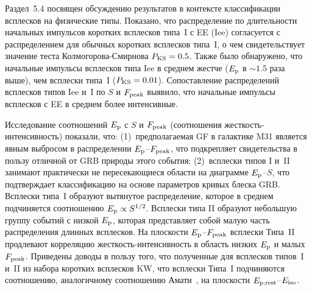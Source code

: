 Раздел~5.4 посвящен обсуждению результатов в контексте классификации всплесков на физические типы.
Показано, что распределение по длительности начальных импульсов коротких всплесков 
типа~I с EE (Iee) согласуется с распределением для обычных коротких всплесков типа~I, 
о чем свидетельствует значение теста Колмогорова-Смирнова $P_{\mathrm{KS}}=0.5$. 
Также было обнаружено, что начальные импульсы всплесков типа Iee в среднем 
жестче ($E_{\mathrm{p}}$ в $\sim 1.5$ раза выше), чем всплески типа~I ($P_{\mathrm{KS}} = 0.01$). 
Сопоставление распределений 
всплесков типов Iee и~I по $S$ и $F_{\mathrm{peak}}$ выявило, что начальные импульсы 
всплесков с EE в среднем более интенсивные. 

Исследование соотношений $E_{\mathrm{p}}$ с $S$ и $F_{\mathrm{peak}}$
(соотношения жесткость-интенсивность) показали, что:
(1)~предполагаемая GF в галактике M31 является явным выбросом в распределении $E_{\mathrm{p}}$--$F_{\mathrm{peak}}$, 
что подкрепляет свидетельства в пользу отличной от GRB природы этого события;
(2)~всплески типов I и~II занимают практически не пересекающиеся области на диаграмме $E_{\mathrm{p}}$--$S$,
что подтверждает классификацию на основе параметров кривых блеска GRB.
Всплески типа~I образуют вытянутое распределение, которое в среднем подчиняется 
соотношению $E_{\mathrm{p}} \propto S^{1/2}$. Всплески типа II образуют небольшую группу событий
с низкой $E_{\mathrm{p}}$, которая представляет собой малую часть распределения длинных всплесков.
На плоскости $E_{\mathrm{p}}$--$F_{\mathrm{peak}}$ всплески Типа~II продлевают корреляцию 
жесткость-интенсивность в область низких $E_{\mathrm{p}}$ и малых $F_{\mathrm{peak}}$.
Приведены доводы в пользу того, что полученные для всплесков типов~I и~II из набора коротких 
всплесков KW, что всплески Типа~I подчиняются 
соотношению, аналогичному соотношению Амати~\citep{Amati_2002AandA}, 
на плоскости $E_{\mathrm{p,rest}}$--$E_{\mathrm{iso}}$.

